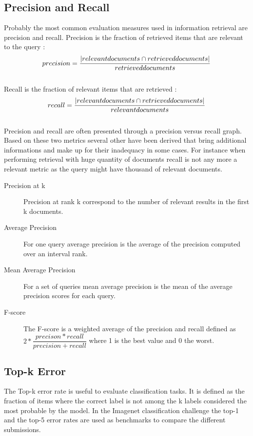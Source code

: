     \subsection{Precision and Recall}

    Probably the most common evaluation measures used in information retrieval are precision and recall. Precision is the fraction of retrieved items that are relevant to the query : \[ precision = \dfrac{\abs{relevant documents \cap retrieved documents}}{retrieved documents} \]
    \\
    Recall is the fraction of relevant items that are retrieved : \[ recall = \dfrac{\abs{relevant documents \cap retrieved documents}}{relevant documents} \]
    \\
    Precision and recall are often presented through a precision versus recall graph.
    Based on these two metrics several other have been derived that bring additional informations and make up for their inadequacy in some cases. For instance when performing retrieval with huge quantity of documents recall is not any more a relevant metric as the query might have thousand of relevant documents.

    \begin{description}
      \item[Precision at k] Precision at rank k correspond to the number of relevant results in the first k documents.
      \item[Average Precision] For one query average precision is the average of the precision computed over an interval rank.
      \item[Mean Average Precision] For a set of queries mean average precision is the mean of the average precision scores for each query.
      \item[F-score] The F-score is a weighted average of the precision and recall defined as \( 2*\dfrac{precison*recall}{precision+recall}\) where 1 is the best value and 0 the worst.
    \end{description}

    \subsection{Top-k Error}

    The Top-k error rate is useful to evaluate classification tasks. It is defined as the fraction of items where the correct label is not among the k labels considered the most probable by the model. In the Imagenet classification challenge the top-1 and the top-5 error rates are used as benchmarks to compare the different submissions.

